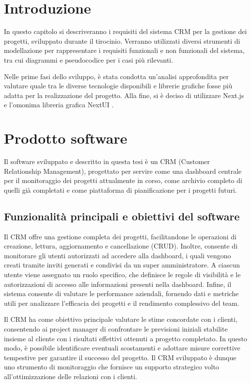 \documentclass[target=bach,aauheader=,style=]{thud}
\begin{document}
\section{Introduzione}
In questo capitolo si descriveranno i requisiti del sistema CRM per la gestione dei progetti, sviluppato durante il tirocinio. Verranno utilizzati diversi strumenti di modellazione per rappresentare i requisiti funzionali e non funzionali del sistema, tra cui diagrammi e pseudocodice per i casi più rilevanti.

\noindent Nelle prime fasi dello sviluppo, è stata condotta un'analisi approfondita per valutare quale tra le diverse tecnologie disponibili e librerie grafiche fosse più adatta per la realizzazione del progetto. Alla fine, si è deciso di utilizzare Next.js \cite{nextjs2024} e l'omonima libreria grafica NextUI \cite{nextui2024}. 

\section{Prodotto software}
Il software sviluppato e descritto in questa tesi è un CRM (Customer Relationship Management), progettato per servire come una dashboard centrale per il monitoraggio dei progetti attualmente in corso, come archivio completo di quelli già completati e come piattaforma di pianificazione per i progetti futuri.

\subsection{Funzionalità principali e obiettivi del software}
Il CRM offre una gestione completa dei progetti, facilitandone le operazioni di creazione, lettura, aggiornamento e cancellazione (CRUD). Inoltre, consente di monitorare gli utenti autorizzati ad accedere alla dashboard, i quali vengono creati tramite inviti generati e condivisi da un super amministratore. A ciascun utente viene assegnato un ruolo specifico, che definisce le regole di visibilità e le autorizzazioni di accesso alle informazioni presenti nella dashboard. Infine, il sistema consente di valutare le performance aziendali, fornendo dati e metriche utili per analizzare l'efficacia dei progetti e il rendimento complessivo del team.

\noindent Il CRM ha come obiettivo principale valutare le stime concordate con i clienti, consentendo ai project manager di confrontare le previsioni iniziali stabilite insieme al cliente con i risultati effettivi ottenuti a progetto completato. In questo modo, è possibile identificare eventuali scostamenti e adottare misure correttive tempestive per garantire il successo del progetto. Il CRM sviluppato è dunque uno strumento di monitoraggio che fornisce un supporto strategico volto all'ottimizzazione delle relazioni con i clienti.
\end{document}
